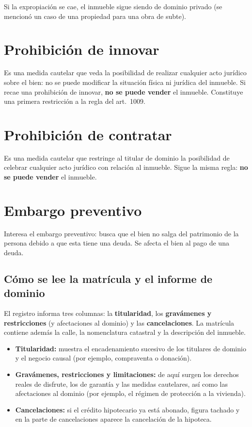 \documentclass[12pt,oneside]{book}
\begin{document}
Si la expropiación se cae, el inmueble sigue siendo de dominio privado (se mencionó un caso de una propiedad para una obra de subte).

\section{Prohibición de innovar}

Es una medida cautelar que veda la posibilidad de realizar cualquier acto jurídico sobre el bien: no se puede modificar la situación física ni jurídica del inmueble. Si recae una prohibición de innovar, \textbf{no se puede vender} el inmueble. Constituye una primera restricción a la regla del art.\ 1009.

\section{Prohibición de contratar}

Es una medida cautelar que restringe al titular de dominio la posibilidad de celebrar cualquier acto jurídico con relación al inmueble. Sigue la misma regla: \textbf{no se puede vender} el inmueble.

\section{Embargo preventivo}

Interesa el embargo preventivo: busca que el bien no salga del patrimonio de la persona debido a que esta tiene una deuda. Se afecta el bien al pago de una deuda.

\subsection{Cómo se lee la matrícula y el informe de dominio}

El registro informa tres columnas: la \textbf{titularidad}, los \textbf{gravámenes y restricciones} (y afectaciones al dominio) y las \textbf{cancelaciones}. La matrícula contiene además la calle, la nomenclatura catastral y la descripción del inmueble.

\begin{itemize}
\item \textbf{Titularidad:} muestra el encadenamiento sucesivo de los titulares de dominio y el negocio causal (por ejemplo, compraventa o donación).
\item \textbf{Gravámenes, restricciones y limitaciones:} de aquí surgen los derechos reales de disfrute, los de garantía y las medidas cautelares, así como las afectaciones al dominio (por ejemplo, el régimen de protección a la vivienda).
\item \textbf{Cancelaciones:} si el crédito hipotecario ya está abonado, figura tachado y en la parte de cancelaciones aparece la cancelación de la hipoteca.
\end{itemize}
\end{document}
